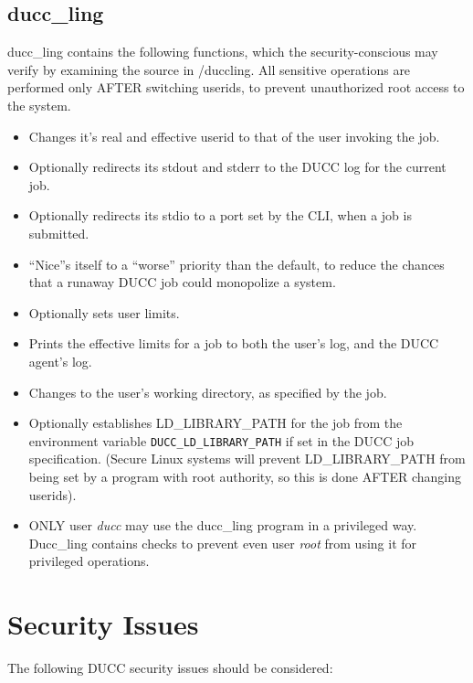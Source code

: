     \subsection{ducc\_ling}   
    \label{sec:duccling.security}
           ducc\_ling contains the following functions, which the security-conscious may verify by examining
       the source in \duccruntime/duccling.  All sensitive operations are performed only AFTER switching
       userids, to prevent unauthorized root access to the system.
       \begin{itemize}
         \item Changes it's real and effective userid to that of the user invoking the job.
         \item Optionally redirects its stdout and stderr to the DUCC log for the current job.
         \item Optionally redirects its stdio to a port set by the CLI, when a job is submitted.
         \item ``Nice''s itself to a ``worse'' priority than the default, to reduce the chances
           that a runaway DUCC job could monopolize a system.
         \item Optionally sets user limits.
         \item Prints the effective limits for a job to both the user's log, and the DUCC agent's log.
         \item Changes to the user's working directory, as specified by the job.
         \item Optionally establishes LD\_LIBRARY\_PATH 
           for the job from the environment variable  {\tt DUCC\_LD\_LIBRARY\_PATH}
           if set in the DUCC job specification. (Secure Linux systems will
           prevent LD\_LIBRARY\_PATH 
           from being set by a program with root authority, so this is
           done AFTER changing userids).
         \item  ONLY user {\em ducc} may use the ducc\_ling program in
           a privileged way. Ducc\_ling contains checks to prevent even user {\em root} from using it for
           privileged operations. 

       \end{itemize}
    
    
    \section{Security Issues}
    The following DUCC security issues should be considered:
    
